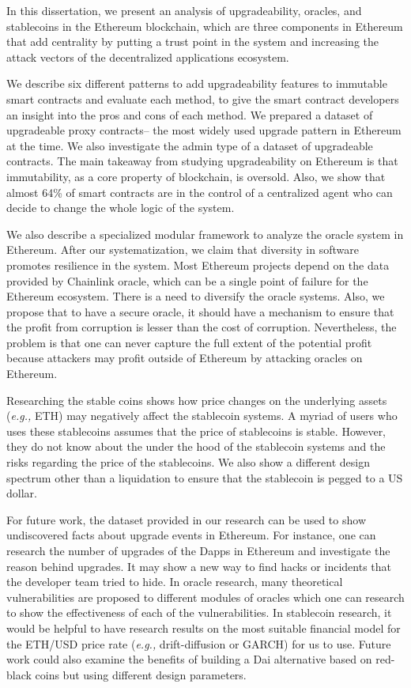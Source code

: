 \documentclass[letterpaper,12pt,onecolumn,final]{report}
\newcommand{\eg}{\textit{e.g.,}\xspace}
\newcommand{\dai}{\textsf{Dai}\xspace}
\begin{document}
In this dissertation, we present an analysis of upgradeability, oracles, and stablecoins in the Ethereum blockchain, which are three components in Ethereum that add centrality by putting a trust point in the system and increasing the attack vectors of the decentralized applications ecosystem.

We describe six different patterns to add upgradeability features to immutable smart contracts and evaluate each method, to give the smart contract developers an insight into the pros and cons of each method. We prepared a dataset of upgradeable proxy contracts-- the most widely used upgrade pattern in Ethereum at the time. We also investigate the admin type of a dataset of upgradeable contracts. The main takeaway from studying upgradeability on Ethereum is that immutability, as a core property of blockchain, is oversold. Also, we show that almost 64\% of smart contracts are in the control of a centralized agent who can decide to change the whole logic of the system.

We also describe a specialized modular framework to analyze the oracle system in Ethereum. After our systematization, we claim that diversity in software promotes resilience in the system. Most Ethereum projects depend on the data provided by Chainlink oracle, which can be a single point of failure for the Ethereum ecosystem. There is a need to diversify the oracle systems. Also, we propose that to have a secure oracle, it should have a mechanism to ensure that the profit from corruption is lesser than the cost of corruption. Nevertheless, the problem is that one can never capture the full extent of the potential profit because attackers may profit outside of Ethereum by attacking oracles on Ethereum. 

Researching the stable coins shows how price changes on the underlying assets (\eg ETH) may negatively affect the stablecoin systems. A myriad of users who uses these stablecoins assumes that the price of stablecoins is stable. However, they do not know about the under the hood of the stablecoin systems and the risks regarding the price of the stablecoins. We also show a different design spectrum other than a liquidation to ensure that the stablecoin is pegged to a US dollar.

For future work, the dataset provided in our research can be used to show undiscovered facts about upgrade events in Ethereum. For instance, one can research the number of upgrades of the Dapps in Ethereum and investigate the reason behind upgrades. It may show a new way to find hacks or incidents that the developer team tried to hide. In oracle research, many theoretical vulnerabilities are proposed to different modules of oracles which one can research to show the effectiveness of each of the vulnerabilities. In stablecoin research, it would be helpful to have research results on the most suitable financial model for the ETH/USD price rate (\eg drift-diffusion or GARCH) for us to use. Future work could also examine the benefits of building a \dai alternative based on red-black coins but using different design parameters.
\end{document}
